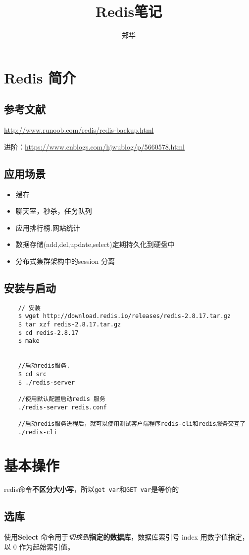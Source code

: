 \documentclass[UTF8,a4paper,12pt]{ctexbook}
\author{\kaishu 郑华}
\title{\heiti Redis笔记}
\begin{document}
 	\maketitle
  

\chapter{Redis 简介}
	
	\section{参考文献}
		\url{http://www.runoob.com/redis/redis-backup.html}
	
		进阶：\url{https://www.cnblogs.com/hjwublog/p/5660578.html}
	\section{应用场景}
		\begin{itemize}
			\item 缓存
			\item 聊天室，秒杀，任务队列
			\item 应用排行榜.网站统计
			\item 数据存储(add,del,update,select)定期持久化到硬盘中
			\item 分布式集群架构中的session 分离
		\end{itemize}
	\section{安装与启动}
		\begin{lstlisting}
	// 安装
	$ wget http://download.redis.io/releases/redis-2.8.17.tar.gz
	$ tar xzf redis-2.8.17.tar.gz
	$ cd redis-2.8.17
	$ make	
	
	
	//启动redis服务.
	$ cd src
	$ ./redis-server
	
	//使用默认配置启动redis	服务
	./redis-server redis.conf
	
	//启动redis服务进程后，就可以使用测试客户端程序redis-cli和redis服务交互了	
	./redis-cli		
		\end{lstlisting}

\chapter{基本操作}	
	redis命令\textbf{不区分大小写}，所以\verb|get var|和\verb|GET var|是等价的
	
	\section{选库}
		使用\textbf{Select} 命令用于\textit{切换到}\textbf{指定的数据库}，数据库索引号 index 用数字值指定，以 0 作为起始索引值。
	
\end{document}
